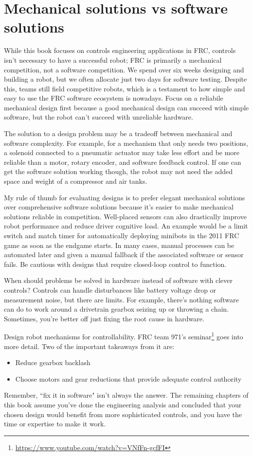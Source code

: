 \section{Mechanical solutions vs software solutions}

While this book focuses on controls engineering applications in FRC, controls
isn't necessary to have a successful robot; FRC is primarily a mechanical
competition, not a software competition. We spend over six weeks designing and
building a robot, but we often allocate just two days for software testing.
Despite this, teams still field competitive robots, which is a testament to how
simple and easy to use the FRC software ecosystem is nowadays. Focus on a
reliabile mechanical design first because a good mechanical design can succeed
with simple software, but the robot can't succeed with unreliable hardware.

The solution to a design problem may be a tradeoff between mechanical and
software complexity. For example, for a mechanism that only needs two positions,
a solenoid connected to a pneumatic actuator may take less effort and be more
reliable than a motor, rotary encoder, and software feedback control. If one can
get the software solution working though, the robot may not need the added space
and weight of a compressor and air tanks.

My rule of thumb for evaluating designs is to prefer elegant mechanical
solutions over comprehensive software solutions because it's easier to make
mechanical solutions reliable in competition. Well-placed sensors can also
drastically improve robot performance and reduce driver cognitive load. An
example would be a limit switch and match timer for automatically deploying
minibots in the 2011 FRC game as soon as the endgame starts. In many cases,
manual processes can be automated later and given a manual fallback if the
associated software or sensor fails. Be cautious with designs that require
closed-loop control to function.

When should problems be solved in hardware instead of software with clever
controls? Controls can handle disturbances like battery voltage drop or
measurement noise, but there are limits. For example, there's nothing software
can do to work around a drivetrain gearbox seizing up or throwing a chain.
Sometimes, you're better off just fixing the root cause in hardware.

Design robot mechanisms for controllability. FRC team 971's
seminar\footnote{\url{https://www.youtube.com/watch?v=VNfFn-gcfFI}} goes into
more detail. Two of the important takeaways from it are:
\begin{itemize}
  \item Reduce gearbox backlash
  \item Choose motors and gear reductions that provide adequate control
        authority
\end{itemize}

Remember, ``fix it in software" isn't always the answer. The remaining chapters
of this book assume you've done the engineering analysis and concluded that your
chosen design would benefit from more sophisticated controls, and you have the
time or expertise to make it work.
